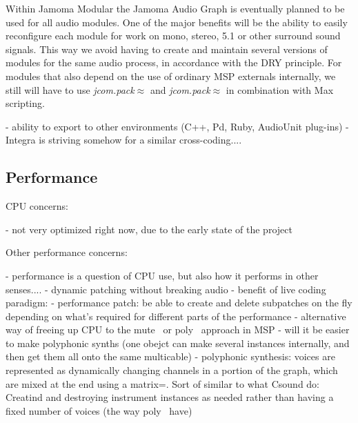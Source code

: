 \documentclass[twoside,a4paper]{article}
\begin{document}
Within Jamoma Modular the Jamoma Audio Graph is eventually planned to be used for all audio modules.
One of the major benefits will be the ability to easily reconfigure each module for work on mono, stereo, 5.1 or other surround sound signals.
This way we avoid having to create and maintain several versions of modules for the same audio process, in accordance with the DRY principle.
For modules that also depend on the use of ordinary MSP externals internally, we still will have to use \emph{jcom.pack$\approx$} and \emph{jcom.pack$\approx$} in combination with Max scripting.




- ability to export to other environments (C++, Pd, Ruby, AudioUnit plug-ins)
- Integra is striving somehow for a similar cross-coding....



\subsection{Performance} %

CPU concerns:

- not very optimized right now, due to the early state of the project

 
Other performance concerns:

- performance is a question of CPU use, but also how it performs in other senses....
- dynamic patching without breaking audio
- benefit of live coding paradigm:
    - performance patch: be able to create and delete subpatches on the fly depending on what's required for different parts of the performance
    - alternative way of freeing up CPU to the mute~ or poly~ approach in MSP
    - will it be easier to make polyphonic synths (one obejct can make several instances internally, and then get them all onto the same multicable)
    - polyphonic synthesis: voices are represented as dynamically changing channels in a portion of the graph, which are mixed at the end using a matrix=. Sort of similar to what Csound do: Creatind and destroying instrument instances as needed rather than having a fixed number of voices (the way poly~ have)
\end{document}
